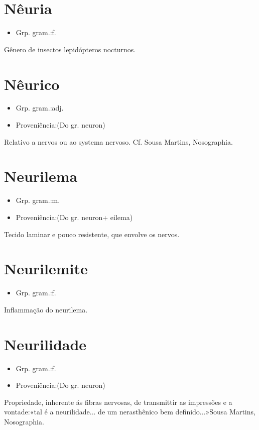 \section{Nêuria}
\begin{itemize}
\item {Grp. gram.:f.}
\end{itemize}
Gênero de insectos lepidópteros nocturnos.
\section{Nêurico}
\begin{itemize}
\item {Grp. gram.:adj.}
\end{itemize}
\begin{itemize}
\item {Proveniência:(Do gr. \textunderscore neuron\textunderscore )}
\end{itemize}
Relativo a nervos ou ao systema nervoso. Cf. Sousa Martins, \textunderscore Nosographia\textunderscore .
\section{Neurilema}
\begin{itemize}
\item {Grp. gram.:m.}
\end{itemize}
\begin{itemize}
\item {Proveniência:(Do gr. \textunderscore neuron\textunderscore  + \textunderscore eilema\textunderscore )}
\end{itemize}
Tecido laminar e pouco resistente, que envolve os nervos.
\section{Neurilemite}
\begin{itemize}
\item {Grp. gram.:f.}
\end{itemize}
Inflammação do neurilema.
\section{Neurilidade}
\begin{itemize}
\item {Grp. gram.:f.}
\end{itemize}
\begin{itemize}
\item {Proveniência:(Do gr. \textunderscore neuron\textunderscore )}
\end{itemize}
Propriedade, inherente ás fibras nervosas, de transmittir as impressões e a vontade:«\textunderscore tal é a neurilidade... de um nerasthênico bem definido...\textunderscore »Sousa Martins, \textunderscore Nosographia\textunderscore .
